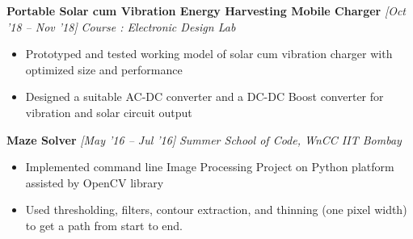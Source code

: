 \documentclass[10 pt]{article}%
\begin{document}
{{{{{{\begin{itemize}[leftmargin=*]
	\end{itemize}
{\flushleft \textbf {\large{Portable Solar cum Vibration Energy Harvesting Mobile Charger}} \hfill {{{\em{[Oct '18 – Nov '18]}}}}
	\vspace{-0.8em}
	{\flushleft \em{Course : Electronic Design Lab}}
	\vspace{-5pt}
	\begin{itemize}[leftmargin=*]
		\setlength\itemsep{1.5pt}
		\setlength\parskip{1.5pt}
			\item Prototyped and tested working model of solar cum vibration charger with optimized size and performance
			\item Designed a suitable AC-DC converter and a DC-DC Boost converter for vibration and solar circuit output
	\end{itemize}
{\flushleft \textbf {\large{Maze Solver}} \hfill {{{\em{[May '16 – Jul '16]}}}}
	\vspace{-0.8em}
	{\flushleft \em{Summer School of Code, WnCC IIT Bombay}}
	\vspace{-5pt}
	\begin{itemize}[leftmargin=*]
		\setlength\itemsep{1.5pt}
		\setlength\parskip{1.5pt}
		\item Implemented command line Image Processing Project on Python platform assisted by OpenCV library
		\item Used thresholding, filters, contour extraction, and thinning (one pixel width) to get a path from start to end.
	\end{itemize}



}}}}}}}}
\end{document}
